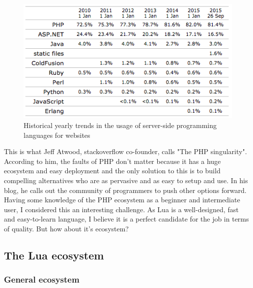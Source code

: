 \documentclass{article}
\begin{document}
\clearpage
\begin{figure}[h]
\centering\includegraphics[scale=0.7]{serverlangstime.png}
\caption{\label{fig:serverlangstime} Historical yearly trends in the usage of server-side programming languages for websites}
\end{figure}


This is what Jeff Atwood, stackoverflow co-founder, calls "The PHP singularity"\autocite{phpsing}. According to him, the faults of PHP don't matter because it has a huge ecosystem and easy deployment and the only solution to this is to build compelling alternatives who are as pervasive and as easy to setup and use. In his blog, he calls out the community of programmers to push other options forward.\\

Having some knowledge of the PHP ecosystem as a beginner and intermediate user, I considered this an interesting challenge. As Lua is a well-designed, fast and easy-to-learn language, I believe it is a perfect candidate for the job in terms of quality. But how about it's ecosystem?\\

\subsection{The Lua ecosystem}

\subsubsection{General ecosystem}
\end{document}
